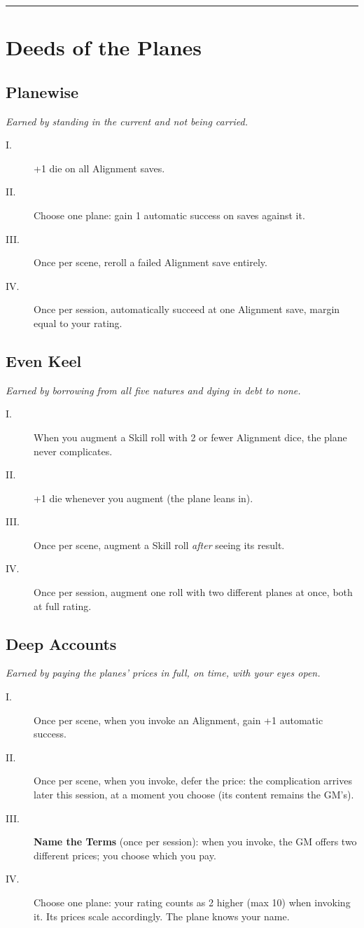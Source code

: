 \medskip\hrule\medskip

\section{Deeds of the Planes}

\subsection{Planewise}
\textit{Earned by standing in the current and not being carried.}
\begin{description}
    \item[I.] +1 die on all Alignment saves.
    \item[II.] Choose one plane: gain 1 automatic success on saves against it.
    \item[III.] Once per scene, reroll a failed Alignment save entirely.
    \item[IV.] Once per session, automatically succeed at one Alignment save, margin equal to your rating.
\end{description}

\subsection{Even Keel}
\textit{Earned by borrowing from all five natures and dying in debt to none.}
\begin{description}
    \item[I.] When you augment a Skill roll with 2 or fewer Alignment dice, the plane never complicates.
    \item[II.] +1 die whenever you augment (the plane leans in).
    \item[III.] Once per scene, augment a Skill roll \textit{after} seeing its result.
    \item[IV.] Once per session, augment one roll with two different planes at once, both at full rating.
\end{description}

\subsection{Deep Accounts}
\textit{Earned by paying the planes' prices in full, on time, with your eyes open.}
\begin{description}
    \item[I.] Once per scene, when you invoke an Alignment, gain +1 automatic success.
    \item[II.] Once per scene, when you invoke, defer the price: the complication arrives later this session, at a moment you choose (its content remains the GM's).
    \item[III.] \textbf{Name the Terms} (once per session): when you invoke, the GM offers two different prices; you choose which you pay.
    \item[IV.] Choose one plane: your rating counts as 2 higher (max 10) when invoking it. Its prices scale accordingly. The plane knows your name.
\end{description}

